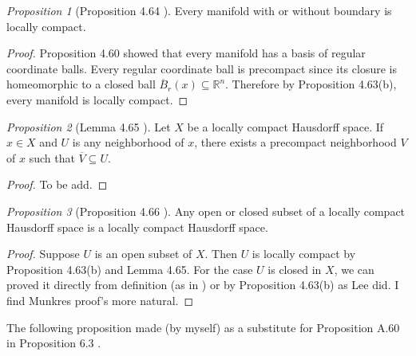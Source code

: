\documentclass[a4paper]{article}
\theoremstyle{remark}
\newtheorem{prop}{Proposition}
\newcommand{\rn}{\mathbb{R}^n} %
\newcommand{\subhim}{\subseteq} %
\begin{document}
\begin{prop}[Proposition 4.64 \cite{LeeTM}]
	Every manifold with or without boundary is locally compact.
\end{prop}
\begin{proof}
	Proposition 4.60 showed that every manifold has a basis of regular coordinate balls. Every regular coordinate ball is precompact since its closure is homeomorphic to a closed ball $\overline{B}_r(x) \subhim \rn$. Therefore by Proposition 4.63(b), every manifold is locally compact.
\end{proof}

\begin{prop}[Lemma 4.65 \cite{LeeTM}]
	Let $X$ be a locally compact Hausdorff space. If $x \in  X$ and $U$ is any neighborhood of $x$, there exists a precompact neighborhood $V$ of $x$ such that $ \overline{V} \subhim U$.
\end{prop}
\begin{proof}
	To be add.
\end{proof}

\begin{prop}[Proposition 4.66 \cite{LeeTM}]
	Any open or closed subset of a locally compact Hausdorff space is a locally compact Hausdorff space.
\end{prop}
\begin{proof}
	Suppose $U$ is an open subset of $X$. Then $U$ is locally compact by Proposition 4.63(b) and Lemma 4.65. For the case $U$ is closed in $X$, we can proved it directly from definition (as in \cite{Munkres}) or by Proposition 4.63(b) as Lee did. I find Munkres proof's more natural. 
\end{proof}

The following proposition made (by myself) as a substitute for Proposition A.60 in Proposition 6.3 \cite{LeeSM}.
\end{document}
